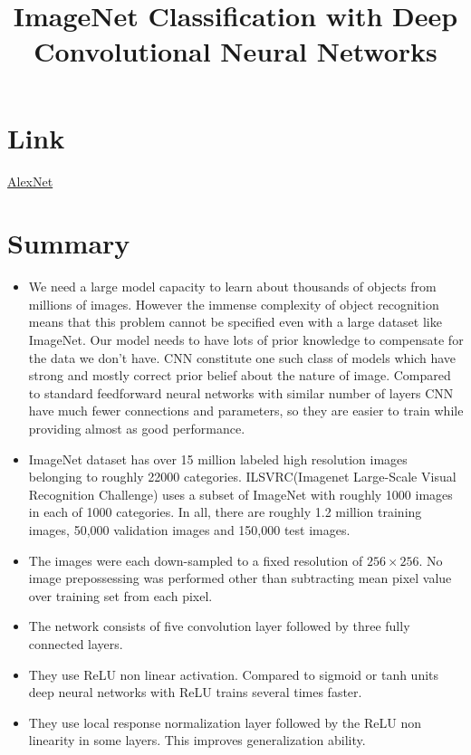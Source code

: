 \documentclass{article}
\title{ImageNet Classification with Deep Convolutional Neural Networks}
\author{}
\date{}
\begin{document}
\maketitle

\section*{Link}
\href{https://papers.nips.cc/paper/4824-imagenet-classification-with-deep-convolutional-neural-networks.pdf}{AlexNet} 

\section*{Summary}
\begin{itemize}
    \item We need a large model capacity to learn about thousands of objects from millions of images. However the immense complexity of object recognition means that this problem cannot be specified even with a large dataset like ImageNet. Our model needs to have lots of prior knowledge to compensate for the data we don't have. CNN constitute one such class of models which have strong and mostly correct prior belief about the nature of image. Compared to standard feedforward neural networks with similar number of layers CNN have much fewer connections and parameters, so they are easier to train while providing almost as good performance.
    \item ImageNet dataset has over 15 million labeled high resolution images belonging to roughly 22000 categories. ILSVRC(Imagenet Large-Scale Visual Recognition Challenge) uses a subset of ImageNet with roughly 1000 images in each of 1000 categories. In all, there are roughly 1.2 million training images, 50,000 validation images and 150,000 test images. 
    \item The images were each down-sampled to a fixed resolution of $256\times 256$. No image prepossessing was performed other than subtracting mean pixel value over training set from each pixel.
    \item The network consists of five convolution layer followed by three fully connected layers.
    \item They use ReLU non linear activation. Compared to sigmoid or tanh units deep neural networks with ReLU trains several times faster.
    \item They use local response normalization layer followed by the ReLU non linearity in some layers. This improves generalization ability.

\end{itemize}
\end{document}
